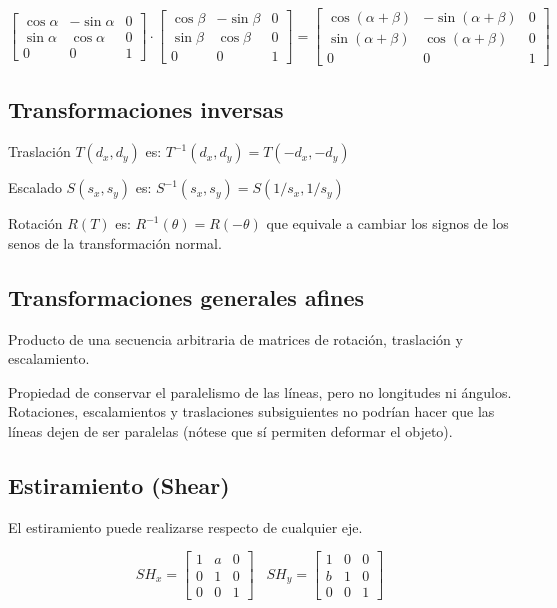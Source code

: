 $$\left[\begin{matrix}
\cos \alpha & - \sin \alpha & 0 \\ \sin \alpha & \cos \alpha & 0 \\ 0 & 0 & 1
\end{matrix}\right] \cdot
\left[\begin{matrix}
\cos \beta & - \sin \beta & 0 \\ \sin \beta & \cos \beta & 0 \\ 0 & 0 & 1
\end{matrix}\right]=
\left[\begin{matrix}
\cos (\alpha + \beta ) & - \sin (\alpha + \beta ) & 0 \\ \sin (\alpha + \beta ) & \cos (\alpha + \beta ) & 0 \\ 0 & 0 & 1
\end{matrix}\right]$$

\subsection{Transformaciones inversas}
Traslación $T( d_x, d_y)$ es: $T^{-1} ( d_x , d_y ) = T( -d_x , -d_y )$

Escalado $S( s_x , s_y )$ es: $S^{-1} ( s_x , s_y ) = S(1/s_x ,1/s_y )$

Rotación $R(T)$ es: $R^{-1}(\theta) = R(-\theta)$ que equivale a cambiar los signos de los senos de la transformación normal.

\subsection{Transformaciones generales afines}
Producto de una secuencia arbitraria de matrices de rotación, traslación y escalamiento.

Propiedad de conservar el paralelismo de las líneas, pero no longitudes ni ángulos. Rotaciones, escalamientos y traslaciones subsiguientes no podrían hacer que las líneas dejen de ser paralelas (nótese que sí permiten deformar el objeto).

\subsection{Estiramiento (Shear)}
El estiramiento puede realizarse respecto de cualquier eje.

$$SH_x = \left[\begin{matrix}
1 & a & 0 \\ 0 & 1 & 0 \\ 0 & 0 & 1
\end{matrix}\right] \;\;\;
SH_y = \left[\begin{matrix}
1 & 0 & 0 \\ b & 1 & 0 \\ 0 & 0 & 1
\end{matrix}\right]$$
